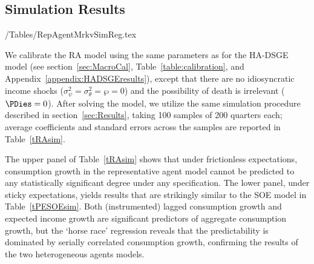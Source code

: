 \subsection{Simulation Results}

\econtexRoot/Tables/RepAgentMrkvSimReg.tex

We calibrate the RA model using the same parameters as for the
HA-DSGE model (see section~\ref{sec:MacroCal}, Table~\ref{table:calibration}, and Appendix~\ref{appendix:HADSGEresults}),
except that there are no idiosyncratic income shocks
($\sigma^2_\psi = \sigma^2_\theta = \wp = 0$) and the possibility
of death is irrelevant ($\PDies=0$).  After solving the model, we
utilize the same simulation procedure described in section~\ref{sec:Results},
taking 100 samples of 200 quarters each; average coefficients
and standard errors across the samples are reported in Table~\ref{tRAsim}.

The upper panel of Table~\ref{tRAsim} shows that under frictionless
expectations, consumption growth in the representative agent model
cannot be predicted to any statistically significant degree under any
specification.  The lower panel, under sticky expectations, yields
results that are strikingly similar to the SOE model in Table~\ref{tPESOEsim}.
Both (instrumented) lagged consumption growth and expected income
growth are significant predictors of aggregate consumption growth,
but the `horse race' regression reveals that the predictability is
dominated by serially correlated consumption growth, confirming the
results of the two heterogeneous agents models.


\begin{comment}
One insight from the recent precautionary saving literature is that
theoretical conclusions about importance of idiosyncratic risk depend
partly on model calibration.  In models calibrated so that the typical
consumer holds a large amount of wealth, behavior closely resembles
behavior of a representative agent economy calibrated to match an
aggregate wealth to income ratio~(\cite{aiyagari:ge};
\cite{ksHetero}; henceforth, the `macro' literature).  If
the model is calibrated to match micro data (and richer
parameterizations of the income process that match micro data are
used), behavior diverges in quantitatively and qualitatively important
ways from the predictions of perfect foresight
models~(\cite{zeldesStochastic}; \cite{carroll:brookings};
\cite{gourinchas&parker:lifecycle}; henceforth, the `micro'
literature).
\end{comment}
